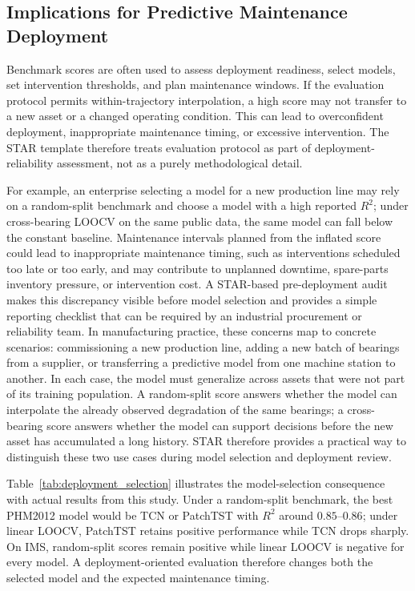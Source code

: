 \documentclass[pdflatex,sn-mathphys-num]{sn-jnl}
\begin{document}
\subsection{Implications for Predictive Maintenance Deployment}
Benchmark scores are often used to assess deployment readiness, select models, set intervention thresholds, and plan maintenance windows. If the evaluation protocol permits within-trajectory interpolation, a high score may not transfer to a new asset or a changed operating condition. This can lead to overconfident deployment, inappropriate maintenance timing, or excessive intervention. The STAR template therefore treats evaluation protocol as part of deployment-reliability assessment, not as a purely methodological detail.

For example, an enterprise selecting a model for a new production line may rely on a random-split benchmark and choose a model with a high reported $R^2$; under cross-bearing LOOCV on the same public data, the same model can fall below the constant baseline. Maintenance intervals planned from the inflated score could lead to inappropriate maintenance timing, such as interventions scheduled too late or too early, and may contribute to unplanned downtime, spare-parts inventory pressure, or intervention cost. A STAR-based pre-deployment audit makes this discrepancy visible before model selection and provides a simple reporting checklist that can be required by an industrial procurement or reliability team. In manufacturing practice, these concerns map to concrete scenarios: commissioning a new production line, adding a new batch of bearings from a supplier, or transferring a predictive model from one machine station to another. In each case, the model must generalize across assets that were not part of its training population. A random-split score answers whether the model can interpolate the already observed degradation of the same bearings; a cross-bearing score answers whether the model can support decisions before the new asset has accumulated a long history. STAR therefore provides a practical way to distinguish these two use cases during model selection and deployment review.

Table~\ref{tab:deployment_selection} illustrates the model-selection consequence with actual results from this study. Under a random-split benchmark, the best PHM2012 model would be TCN or PatchTST with $R^2$ around $0.85$--$0.86$; under linear LOOCV, PatchTST retains positive performance while TCN drops sharply. On IMS, random-split scores remain positive while linear LOOCV is negative for every model. A deployment-oriented evaluation therefore changes both the selected model and the expected maintenance timing.
\end{document}
